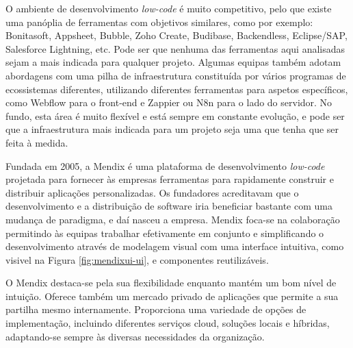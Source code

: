     O ambiente de desenvolvimento \textit{low-code} é muito competitivo, pelo que existe uma panóplia de ferramentas com objetivos similares, como por exemplo: Bonitasoft, Appsheet, Bubble, Zoho Create, Budibase, Backendless, Eclipse/SAP, Salesforce Lightning, etc. Pode ser que nenhuma das ferramentas aqui analisadas sejam a mais indicada para qualquer projeto. Algumas equipas também adotam abordagens com uma pilha de infraestrutura constituída por vários programas de ecossistemas diferentes, utilizando diferentes ferramentas para aspetos específicos, como Webflow para o front-end e Zappier ou N8n para o lado do servidor. No fundo, esta área é muito flexível e está sempre em constante evolução, e pode ser que a infraestrutura mais indicada para um projeto seja uma que tenha que ser feita à medida.
        



    \label{secsecsec:mendix}
        
        Fundada em 2005, a Mendix é uma plataforma de desenvolvimento \textit{low-code} projetada para fornecer às empresas ferramentas para rapidamente construir e distribuir aplicações personalizadas. Os fundadores acreditavam que o desenvolvimento e a distribuição de software iria beneficiar bastante com uma mudança de paradigma, e daí nasceu a empresa. Mendix foca-se na colaboração permitindo às equipas trabalhar efetivamente em conjunto e simplificando o desenvolvimento através de modelagem visual com uma interface intuitiva, como visivel na Figura \ref{fig:mendixui-ui}, e componentes reutilizáveis\cite{why-was-mendix-founded}.

        O Mendix destaca-se pela sua flexibilidade enquanto mantém um bom nível de intuição. Oferece também um mercado privado de aplicações que permite a sua partilha mesmo internamente. Proporciona uma variedade de opções de implementação, incluindo diferentes serviços cloud, soluções locais e híbridas, adaptando-se sempre às diversas necessidades da organização\cite{outsystems-vs-mendix}.

